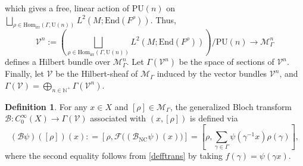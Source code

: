 \documentclass[11pt,oneside,reqno]{amsart}
\theoremstyle{definition}
\newtheorem{definition}{Definition}[section]
\numberwithin{equation}{section}
\theoremstyle{plain}
\begin{document}
which gives a free, linear action of $\mathrm{PU}(n)$ on 
$\bigsqcup\limits_{\rho \in \mathrm{Hom}_{\mathrm{irr}}(\Gamma, \mathrm{U}(n))}L^2(M;\mathrm{End}(F^{\rho}))$. Thus,
\begin{equation} \label{eq:Vn}
\mathcal{V}^n := \left( \bigsqcup_{\rho \in \mathrm{Hom}_{\mathrm{irr}}(\Gamma, \mathrm{U}(n))}L^2(M;\mathrm{End}(F^{\rho})) \right) \bigg/ \mathrm{PU}(n) \longrightarrow \mathcal{M}^n_{\Gamma}
\end{equation}
defines a Hilbert bundle over $\mathcal{M}^n_{\Gamma}$. Let $\Gamma(\mathcal{V}^n)$ be the space of sections of $\mathcal{V}^n$. Finally, let $\mathcal{V}$ be the Hilbert-sheaf of $\mathcal{M}_{\Gamma}$ induced by the vector bundles $\mathcal{V}^n$, and $\Gamma(\mathcal{V}) = \bigoplus\limits_{n\in \mathbb{N}^+} \Gamma(\mathcal{V}^n)$.
\begin{definition}\label{defbloch1}
For any $x\in X$ and $[\rho]\in \mathcal{M}_\Gamma$, the  generalized Bloch transform $\mathcal{B}: C_0^{\infty}(X) \rightarrow \Gamma(\mathcal{V})$ associated with $(x,[\rho])$
is defined via
\begin{equation}\label{btrans}
    (\mathcal{B}\psi)([\rho]) (x) : = \left[ \rho, \mathcal{F}\Big( (\mathcal{B}_{\mathrm{NC}}\psi)(x) \Big)\right]=\left[ \rho, \sum_{\gamma \in \Gamma} \psi(\gamma^{-1} x)\rho(\gamma) \right],
\end{equation}
where the second equality follows from \eqref{defftrans} by taking $f(\gamma)=\psi(\gamma x)$.
\end{definition}
\end{document}
